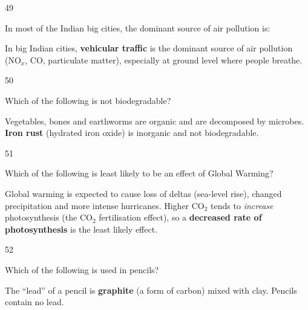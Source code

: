 \begin{question}{49}
{In most of the Indian big cities, the dominant source of air pollution is:\par}
\begin{explain}
In big Indian cities, \textbf{vehicular traffic} is the dominant source of air pollution (NO$_x$, CO, particulate matter), especially at ground level where people breathe.
\end{explain}
\end{question}

\begin{question}{50}
{Which of the following is not biodegradable?\par}
\begin{explain}
Vegetables, bones and earthworms are organic and are decomposed by microbes. \textbf{Iron rust} (hydrated iron oxide) is inorganic and not biodegradable.
\end{explain}
\end{question}

\begin{question}{51}
{Which of the following is least likely to be an effect of Global Warming?\par}
\begin{explain}
Global warming is expected to cause loss of deltas (sea-level rise), changed precipitation and more intense hurricanes. Higher CO$_2$ tends to \emph{increase} photosynthesis (the CO$_2$ fertilisation effect), so a \textbf{decreased rate of photosynthesis} is the least likely effect.
\end{explain}
\end{question}

\begin{question}{52}
{Which of the following is used in pencils?\par}
\begin{explain}
The ``lead'' of a pencil is \textbf{graphite} (a form of carbon) mixed with clay. Pencils contain no lead.
\end{explain}
\end{question}

